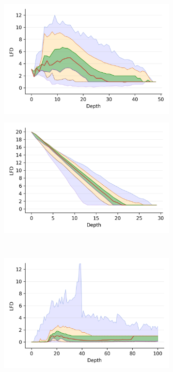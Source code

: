 \begin{figure}
\begin{subfigure}[b]{0.5\textwidth}
        \includegraphics[width=0.99\textwidth]{images/lfd/sift.png}\\
        \label{fig:results:sift-lfd}
    \end{subfigure}%
    \begin{subfigure}[b]{0.5\textwidth}
        \includegraphics[width=0.99\textwidth]{images/lfd/random.png}\\
        \label{fig:results:random-lfd}
    \end{subfigure}
    \\
    \begin{subfigure}[b]{0.5\textwidth}
        \includegraphics[width=0.99\textwidth]{images/lfd/silva-SSU-Ref.png}\\

\end{subfigure}
\end{figure}
